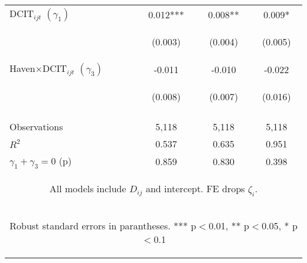 \begin{center}
\begin{tabular}{lccc}
$ \text{DCIT}_{ijt}$ $(\gamma_1)$ & 0.012*** & 0.008** & 0.009* \\
\vspace{4pt} & \begin{footnotesize}(0.003)\end{footnotesize} & \begin{footnotesize}(0.004)\end{footnotesize} & \begin{footnotesize}(0.005)\end{footnotesize} \\
Haven$\times\text{DCIT}_{ijt}$ $(\gamma_3)$ & -0.011 & -0.010 & -0.022 \\
 & \begin{footnotesize}(0.008)\end{footnotesize} & \begin{footnotesize}(0.007)\end{footnotesize} & \begin{footnotesize}(0.016)\end{footnotesize} \\
\vspace{4pt} & \begin{footnotesize}\end{footnotesize} & \begin{footnotesize}\end{footnotesize} & \begin{footnotesize}\end{footnotesize} \\
Observations & 5,118 & 5,118 & 5,118 \\
$R^2$ & 0.537 & 0.635 & 0.951 \\
 $\gamma_1+\gamma_3 =0$ (p) & 0.859 & 0.830 & 0.398 \\ \hline
\multicolumn{4}{c}{\begin{footnotesize} All models include $ D_{ij}$ and intercept. FE drops $\zeta_i$.\end{footnotesize}} \\
\multicolumn{4}{c}{\begin{footnotesize} Robust standard errors in parantheses. *** p$<$0.01, ** p$<$0.05, * p$<$0.1\end{footnotesize}} \\
\end{tabular}
\end{center}
